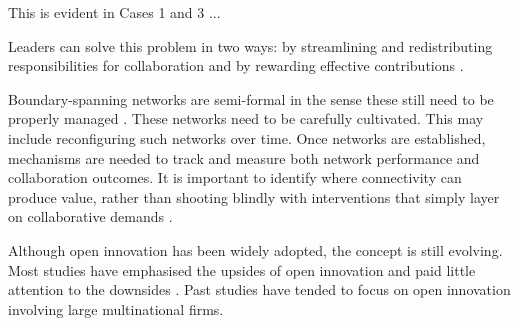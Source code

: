 This is evident in Cases 1 and 3 ...

Leaders can solve this problem in two ways: by streamlining and redistributing responsibilities for collaboration and by rewarding effective contributions \citep{cross2016collaborative}. 

Boundary-spanning networks are semi-formal in the sense these still need to be properly managed \citep{cross2015investing}. These networks need to be carefully cultivated. This may include reconfiguring such networks over time. Once networks are established, mechanisms are needed to track and measure both network performance and collaboration outcomes. It is important to identify where connectivity can produce value, rather than shooting blindly with interventions that simply layer on collaborative demands \citep{cross2015investing}.

Although open innovation has been widely adopted, the concept is still evolving. Most studies have emphasised the upsides of open innovation and paid little attention to the downsides \citep{hossain2013open}. Past studies have tended to focus on open innovation involving large multinational firms. 